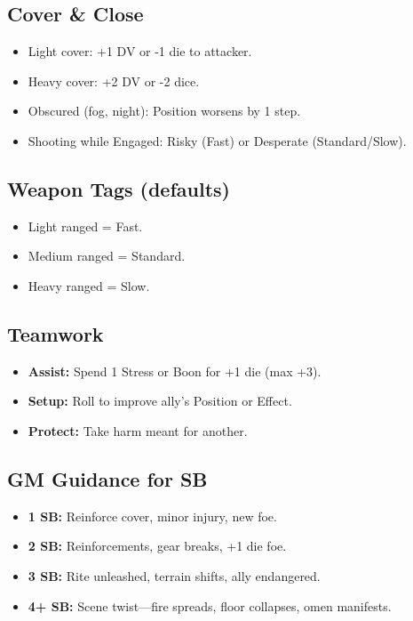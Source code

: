 \subsection*{Cover \& Close}
\begin{itemize}
  \item Light cover: +1 DV or -1 die to attacker.
  \item Heavy cover: +2 DV or -2 dice.
  \item Obscured (fog, night): Position worsens by 1 step.
  \item Shooting while Engaged: Risky (Fast) or Desperate (Standard/Slow).
\end{itemize}

\subsection*{Weapon Tags (defaults)}
\begin{itemize}
  \item Light ranged = Fast.
  \item Medium ranged = Standard.
  \item Heavy ranged = Slow.
\end{itemize}

\subsection{Teamwork}
\begin{itemize}
  \item \textbf{Assist:} Spend 1 Stress or Boon for +1 die (max +3).
  \item \textbf{Setup:} Roll to improve ally’s Position or Effect.
  \item \textbf{Protect:} Take harm meant for another.
\end{itemize}

\subsection{GM Guidance for SB}
\begin{itemize}
  \item \textbf{1 SB:} Reinforce cover, minor injury, new foe.
  \item \textbf{2 SB:} Reinforcements, gear breaks, +1 die foe.
  \item \textbf{3 SB:} Rite unleashed, terrain shifts, ally endangered.
  \item \textbf{4+ SB:} Scene twist—fire spreads, floor collapses, omen manifests.
\end{itemize}

